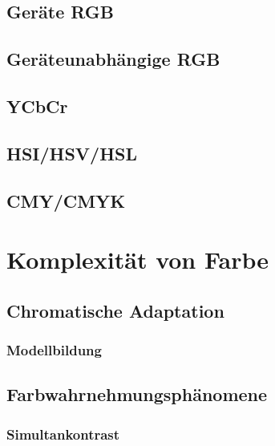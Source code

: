 \documentclass[a4paper, 11pt, accentcolor = tud3b]{tudreport}
\begin{document}
			\subsection{Geräte RGB} %

			\subsection{Geräteunabhängige RGB} %

			\subsection{YCbCr} %

			\subsection{HSI/HSV/HSL} %

			\subsection{CMY/CMYK} %

		\section{Komplexität von Farbe} %

			\subsection{Chromatische Adaptation} %

				\subsubsection{Modellbildung} %

			\subsection{Farbwahrnehmungsphänomene} %

				\subsubsection{Simultankontrast} %
\end{document}
